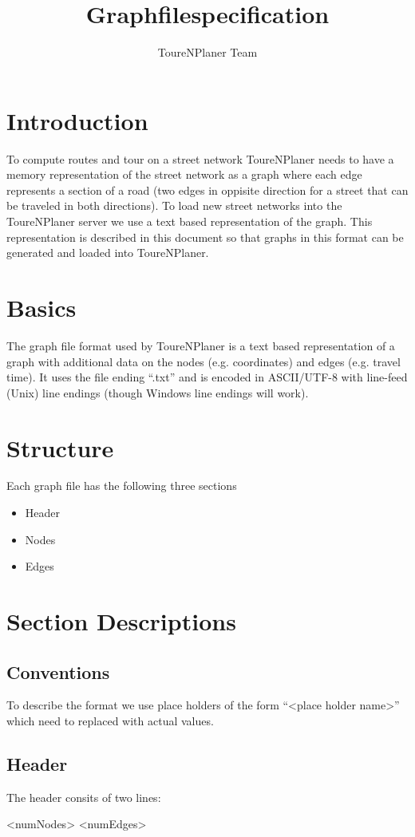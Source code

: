 \documentclass[ngerman,titlepage,parskip=true]{scrartcl}
\title{Graphfilespecification}
\author{ToureNPlaner Team}
\begin{document}
\maketitle

\tableofcontents

\section{Introduction}
To compute routes and tour on a street network ToureNPlaner needs to have a memory representation of the street network as 
a graph where each edge represents a section of a road (two edges in oppisite direction for a street that can be traveled in both directions).
To load new street networks into the ToureNPlaner server we use a text based representation of the graph.
This representation is described in this document so that graphs in this format can be generated and loaded into ToureNPlaner.

\section{Basics}
The graph file format used by ToureNPlaner is a text based representation of a graph with additional data on the nodes (e.g. coordinates)
and edges (e.g. travel time).
It uses the file ending ``.txt'' and is encoded in ASCII/UTF-8 with line-feed (Unix) line endings (though Windows line endings will work).

\section{Structure}
Each graph file has the following three sections
\begin{itemize}
 \item Header
 \item Nodes
 \item Edges
\end{itemize}

\section{Section Descriptions}
\subsection{Conventions}
To describe the format we use place holders of the form ``<place holder name>'' which need to replaced with
actual values.

\subsection{Header}
The header consits of two lines:
\begin{verbatim*}
<numNodes>
<numEdges>
\end{verbatim*}
\end{document}
